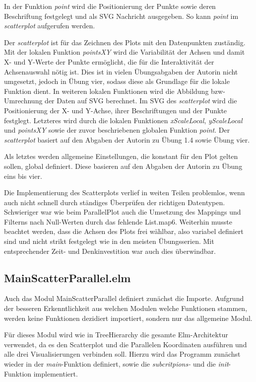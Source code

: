 \documentclass[usegeometry=true]{scrartcl}
\begin{document}
In der Funktion \textit{point} wird die Positionierung der Punkte sowie deren Beschriftung festgelegt und als SVG Nachricht ausgegeben.
So kann \textit{point} im \textit{scatterplot} aufgerufen werden.

Der \textit{scatterplot} ist für das Zeichnen des Plots mit den Datenpunkten zuständig. 
Mit der lokalen Funktion \textit{pointsXY} wird die Variabilität der Achsen und damit X- und Y-Werte der Punkte ermöglicht, die für die Interaktivität der Achsenauswahl nötig ist.
Dies ist in vielen Übungsabgaben der Autorin nicht umgesetzt, jedoch in Übung vier, sodass diese als Grundlage für die lokale Funktion dient. 
In weiteren lokalen Funktionen wird die Abbildung bzw- Umrechnung der Daten auf SVG berechnet.
Im SVG des \textit{scatterplot} wird die Positionierung der X- und Y-Achse, ihrer Beschriftungen und der Punkte festglegt. 
Letzteres wird durch die lokalen Funktionen \textit{xScaleLocal}, \textit{yScaleLocal} und \textit{pointsXY} sowie der zuvor beschriebenen globalen Funktion \textit{point}.
Der \textit{scatterplot} basiert auf den Abgaben der Autorin zu Übung 1.4 sowie Übung vier. 

Als letztes werden allgemeine Einstellungen, die konstant für den Plot gelten sollen, global definiert. 
Diese basieren auf den Abgaben der Autorin zu Übung eins bis vier.

Die Implementierung des Scatterplots verlief in weiten Teilen problemlos, wenn auch nicht schnell durch ständiges Überprüfen der richtigen Datentypen.
Schwieriger war wie beim ParallelPlot auch die Umsetzung des Mappings und Filterns nach Null-Werten durch das fehlende List.map6.
Weiterhin musste beachtet werden, dass die Achsen des Plots frei wählbar, also variabel definiert sind und nicht strikt festgelegt wie in den meisten Übungsserien.
Mit entsprechender Zeit- und Denkinvestition war auch dies überwindbar.

\subsection{MainScatterParallel.elm}
Auch das Modul MainScatterParallel definiert zunächst die Importe. 
Aufgrund der besseren Erkenntlichkeit aus welchen Modulen welche Funktionen stammen, werden keine Funktionen dezidiert importiert, sondern nur das allgemeine Modul. 

Für dieses Modul wird wie in TreeHierarchy die gesamte Elm-Architektur verwendet, da es den Scatterplot und die Parallelen Koordinaten ausführen und alle drei Visualisierungen verbinden soll.
Hierzu wird das Programm zunächst wieder in der \textit{main}-Funktion definiert, sowie die \textit{subcritpions-} und die \textit{init}-Funktion implementiert.
\end{document}

